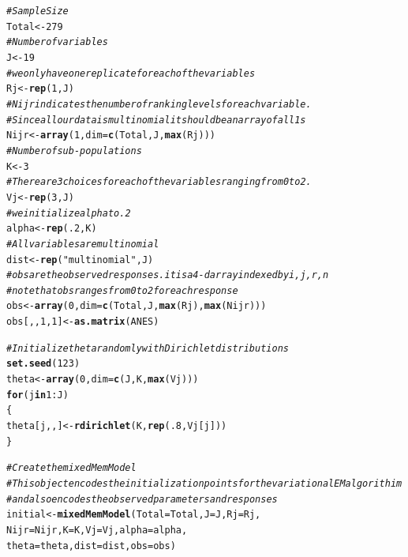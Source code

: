 \documentclass{article}\usepackage[]{graphicx}\usepackage[]{color}
\makeatletter
\newcommand{\hlnum}[1]{\textcolor[rgb]{0.686,0.059,0.569}{#1}}%
\newcommand{\hlstr}[1]{\textcolor[rgb]{0.192,0.494,0.8}{#1}}%
\newcommand{\hlcom}[1]{\textcolor[rgb]{0.678,0.584,0.686}{\textit{#1}}}%
\newcommand{\hlopt}[1]{\textcolor[rgb]{0,0,0}{#1}}%
\newcommand{\hlstd}[1]{\textcolor[rgb]{0.345,0.345,0.345}{#1}}%
\newcommand{\hlkwa}[1]{\textcolor[rgb]{0.161,0.373,0.58}{\textbf{#1}}}%
\newcommand{\hlkwb}[1]{\textcolor[rgb]{0.69,0.353,0.396}{#1}}%
\newcommand{\hlkwc}[1]{\textcolor[rgb]{0.333,0.667,0.333}{#1}}%
\newcommand{\hlkwd}[1]{\textcolor[rgb]{0.737,0.353,0.396}{\textbf{#1}}}%
\newenvironment{kframe}{%
 \def\at@end@of@kframe{}%
 \ifinner\ifhmode%
  \def\at@end@of@kframe{\end{minipage}}%
  \begin{minipage}{\columnwidth}%
 \fi\fi%
 \def\FrameCommand##1{\hskip\@totalleftmargin \hskip-\fboxsep
 \colorbox{shadecolor}{##1}\hskip-\fboxsep
     \hskip-\linewidth \hskip-\@totalleftmargin \hskip\columnwidth}%
 \MakeFramed {\advance\hsize-\width
   \@totalleftmargin\z@ \linewidth\hsize
   \@setminipage}}%
 {\par\unskip\endMakeFramed%
 \at@end@of@kframe}
\newenvironment{knitrout}{}{} %
\renewenvironment{knitrout}{\begin{singlespace}}{\end{singlespace}}
\makeatother
\begin{document}
\begin{knitrout}
\color{fgcolor}\begin{kframe}
\begin{alltt}
\hlcom{# Sample Size}
\hlstd{Total} \hlkwb{<-} \hlnum{279}
\hlcom{# Number of variables}
\hlstd{J} \hlkwb{<-} \hlnum{19}
\hlcom{# we only have one replicate for each of the variables}
\hlstd{Rj} \hlkwb{<-} \hlkwd{rep}\hlstd{(}\hlnum{1}\hlstd{, J)}
\hlcom{# Nijr indicates the number of ranking levels for each variable.}
\hlcom{# Since all our data is multinomial it should be an array of all 1s}
\hlstd{Nijr} \hlkwb{<-} \hlkwd{array}\hlstd{(}\hlnum{1}\hlstd{,} \hlkwc{dim} \hlstd{=} \hlkwd{c}\hlstd{(Total, J,} \hlkwd{max}\hlstd{(Rj)))}
\hlcom{# Number of sub-populations}
\hlstd{K} \hlkwb{<-} \hlnum{3}
\hlcom{# There are 3 choices for each of the variables ranging from 0 to 2.}
\hlstd{Vj} \hlkwb{<-} \hlkwd{rep}\hlstd{(}\hlnum{3}\hlstd{, J)}
\hlcom{# we initialize alpha to .2}
\hlstd{alpha} \hlkwb{<-} \hlkwd{rep}\hlstd{(}\hlnum{.2}\hlstd{, K)}
\hlcom{# All variables are multinomial}
\hlstd{dist} \hlkwb{<-} \hlkwd{rep}\hlstd{(}\hlstr{"multinomial"}\hlstd{, J)}
\hlcom{# obs are the observed responses. it is a 4-d array indexed by i,j,r,n}
\hlcom{# note that obs ranges from 0 to 2 for each response}
\hlstd{obs} \hlkwb{<-} \hlkwd{array}\hlstd{(}\hlnum{0}\hlstd{,} \hlkwc{dim} \hlstd{=} \hlkwd{c}\hlstd{(Total, J,} \hlkwd{max}\hlstd{(Rj),} \hlkwd{max}\hlstd{(Nijr)))}
\hlstd{obs[,,}\hlnum{1}\hlstd{,}\hlnum{1}\hlstd{]} \hlkwb{<-} \hlkwd{as.matrix}\hlstd{(ANES)}

\hlcom{# Initialize theta randomly with Dirichlet distributions}
\hlkwd{set.seed}\hlstd{(}\hlnum{123}\hlstd{)}
\hlstd{theta} \hlkwb{<-} \hlkwd{array}\hlstd{(}\hlnum{0}\hlstd{,} \hlkwc{dim}\hlstd{=} \hlkwd{c}\hlstd{(J,K,}\hlkwd{max}\hlstd{(Vj)))}
\hlkwa{for}\hlstd{(j} \hlkwa{in} \hlnum{1}\hlopt{:}\hlstd{J)}
\hlstd{\{}
    \hlstd{theta[j,,]} \hlkwb{<-} \hlkwd{rdirichlet}\hlstd{(K,}\hlkwd{rep}\hlstd{(}\hlnum{.8}\hlstd{,Vj[j]))}
\hlstd{\}}

\hlcom{# Create the mixedMemModel}
\hlcom{# This object encodes the initialization points for the variational EM algorithim}
\hlcom{# and also encodes the observed parameters and responses}
\hlstd{initial} \hlkwb{<-} \hlkwd{mixedMemModel}\hlstd{(}\hlkwc{Total} \hlstd{= Total,} \hlkwc{J} \hlstd{= J,} \hlkwc{Rj} \hlstd{= Rj,}
                         \hlkwc{Nijr} \hlstd{= Nijr,} \hlkwc{K} \hlstd{= K,} \hlkwc{Vj} \hlstd{= Vj,} \hlkwc{alpha} \hlstd{= alpha,}
                         \hlkwc{theta} \hlstd{= theta,} \hlkwc{dist} \hlstd{= dist,} \hlkwc{obs} \hlstd{= obs)}
\end{alltt}
\end{kframe}
\end{knitrout}
\end{document}
